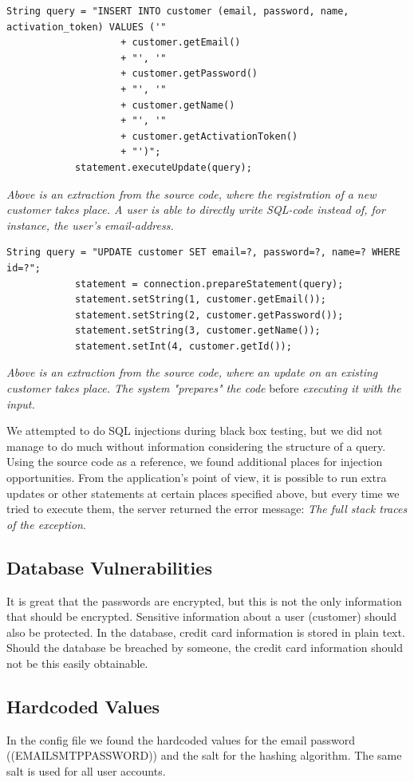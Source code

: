 \begin{lstlisting}
String query = "INSERT INTO customer (email, password, name, activation_token) VALUES ('"
                    + customer.getEmail()
                	+ "', '"
                	+ customer.getPassword()
                	+ "', '"
                	+ customer.getName()
                	+ "', '"
                	+ customer.getActivationToken()
                	+ "')";
        	statement.executeUpdate(query);
\end{lstlisting}
{\em Above is an extraction from the source code, where the registration of a new customer takes place. A user is able to directly write SQL-code instead of, for instance, the user's email-address.}

\begin{lstlisting}
String query = "UPDATE customer SET email=?, password=?, name=? WHERE id=?";
            statement = connection.prepareStatement(query);
        	statement.setString(1, customer.getEmail());
        	statement.setString(2, customer.getPassword());
        	statement.setString(3, customer.getName());
        	statement.setInt(4, customer.getId());
\end{lstlisting}
{\em Above is an extraction from the source code, where an update on an existing customer takes place. The system "prepares" the code} before {\em executing it with the input.}

We attempted to do SQL injections during black box testing, but we did not manage to do much without information considering the structure of a query. Using the source code as a reference, we found additional places for injection opportunities. From the application's point of view, it is possible to run extra updates or other statements at certain places specified above, but every time we tried to execute them, the server returned the error message: {\em The full stack traces of the exception}.

\subsection{Database Vulnerabilities}
It is great that the passwords are encrypted, but this is not the only information that should be encrypted. Sensitive information about a user (customer) should also be protected. In the database, credit card information is stored in plain text. Should the database be breached by someone, the credit card information should not be this easily obtainable.

\subsection{Hardcoded Values}
In the config file we found the hardcoded values for the email password ((EMAIL\textunderscore SMTP\textunderscore PASSWORD)) and the salt for the hashing algorithm. The same salt is used for all user accounts.

